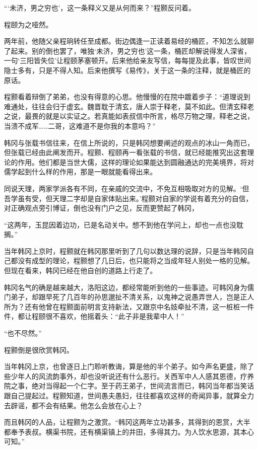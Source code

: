 “‘未济，男之穷也’，这一条释义又是从何而来？”程颢反问着。

程颐为之哑然。

两年前，他随父亲程珦转任至成都。街边偶逢一正读着易经的桶匠，不知怎么就聊了起来。别的倒也罢了，唯独‘未济，男之穷也’这一条，桶匠却解说得发人深省，一句‘三阳皆失位’让程颐茅塞顿开。后来他给亲友写信，每每提及此事，皆叹世间隐士多有，只是不得人知。后来他撰写《易传》，关于这一条的注释，就是桶匠的原话。

程颢看着辩倒了弟弟，也没有得意的心思。他慢慢的在院中踱着步子：“道理说到难通处，往往会归于虚玄。魏晋耽于清玄，唐人崇于释老，莫不如此。但清玄释老之说，最畏的就是以实证之。若真能如表叔信中所言，格尽万物之理，释老之说，当溃不成军……二哥，这难道不是你我的本意吗？”

韩冈与张载书信往来，在信上所说的，只是韩冈想要阐述的观点的冰山一角而已，但张载已经由此阐发而开。程颢、程颐再一看张载的书信，就已经能推究出这套理论的作用。他们都是当世大儒，这样的理论如果能达到圆融通达的完美境界，将对儒学起到什么样的作用，那是一眼就能看得出来。

同说天理，两家学派各有不同，在亲戚的交流中，不免互相吸取对方的见解。‘但吾学虽有受，但天理二字却是自家体贴出来。’程颢对自家的学说有着充分的自信，对正确观点旁引博证，倒也没有门户之见，反而更赞起了韩冈，

“这两年，玉昆因着边功，已是名动关中。想不到他在学问上，却也一点也没耽搁。”

当年韩冈上京时，程颢就在韩冈那里听到了几句以数达理的说辞，只是当年韩冈自己都没有成型的理论，程颢想了几日后，也只能将之当成年轻人别处一格的见解。但现在看来，韩冈已经在他自创的道路上行走了。

韩冈名气的确是越来越大，洛阳这边，都经常能听到他的一些事迹。可韩冈身为儒门弟子，却跟早死了几百年的孙思邈扯不清关系，以鬼神之说愚弄世人，岂是正人所为？还有他曾在程颢面前明言支持新法，又跟京中名妓牵扯不清，这一桩桩一件件，都让程颐很不喜欢，他摇着头：“此子非是我辈中人！”

“也不尽然。”

程颢倒是很欣赏韩冈。

当年韩冈上京，也曾逐日上门聆听教诲，算是他的半个弟子。如今声名更盛，除了些少年人的风流韵事外，却也没听说还有什么恶行。关西军中人人感其恩德，疗养院之事，绝对当得起一个仁字。至于药王弟子，世间流言而已，韩冈当年都当笑话跟自己提起过。程颢知道，世间愚夫愚妇，往往都喜欢这样的奇闻异事，就算全力去辟谣，都不会有结果。他怎么会放在心上？

而且韩冈的人品，让程颢为之激赏。“韩冈这两年立功甚多，其得到的恩赏，大半都奉予表叔。横渠书院，还有横渠镇上的井田，多得其力。为人饮水思源，其本心可知。”

